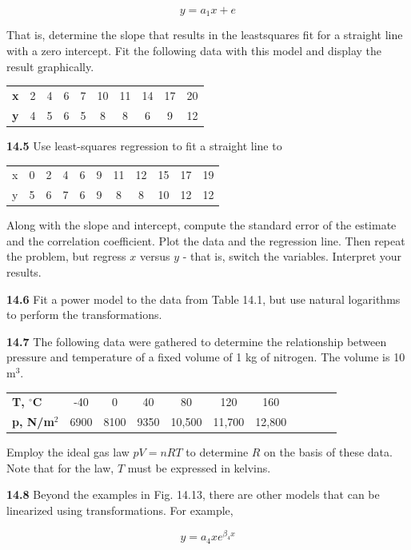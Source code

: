 \documentclass[../main.tex]{subfiles}
\begin{document}
\begin{multicols}{2}
	$$y = a_1 x + e$$

	\noindent That is, determine the slope that results in the leastsquares fit for a straight line with a zero intercept. Fit the following data with this model and display the result graphically.

	\noindent \begin{tabular}{c c c c c c c c c c }
	 	\textbf{x} & 2 & 4 & 6 & 7 & 10 & 11 & 		14 & 		17 & 		20 \\
	  	\textbf{y} & 4 & 5 & 6 & 5 & 8 & 8 & 6 & 9 & 		12
	\end{tabular}

	\noindent\textbf{14.5} Use least-squares regression to fit a straight line to

	\noindent \begin{tabular}{c c c c c c c c c c c  }
 		x & 0 & 2 & 4 & 6 & 9 & 11 & 12 & 15 & 17 & 19 \\
 		y & 5 & 6 & 7 & 6 & 9 & 8 & 8 & 10 & 12 & 12
   	\end{tabular}

   	\noindent Along with the slope and intercept, compute the standard
	   error of the estimate and the correlation coefficient. Plot the
	   data and the regression line. Then repeat the problem, but
	   regress $x$ versus $y$ - that is, switch the variables. Interpret
	   your results.

	\noindent\textbf{14.6} Fit a power model to the data from Table 14.1, but use
	natural logarithms to perform the transformations.

	\noindent\textbf{14.7} The following data were gathered to determine the
	relationship between pressure and temperature of a fixed
	volume of 1 kg of nitrogen. The volume is 10 m$^3$.

	\noindent \begin{tabular}{l c c c c c c c c c c  }
		\textbf{T, $^\circ$C} & -40 & 0 & 40 & 80 & 120 & 160 \\
		\textbf{p, N/m$^2$} & 6900 & 8100 & 9350 & 10,500 & 11,700 & 12,800
  	\end{tabular}

	\noindent Employ the ideal gas law $pV = nRT$ to determine $R$ on the
	basis of these data. Note that for the law, $T$ must be expressed
	in kelvins.

	\noindent\textbf{14.8} Beyond the examples in Fig. 14.13, there are other
	models that can be linearized using transformations. For
	example,

	$$y = a_4 x e^{\beta_4 x}$$


\end{multicols}
\end{document}
